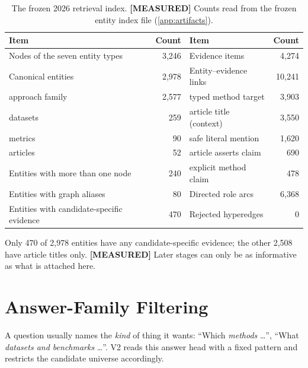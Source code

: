 \documentclass[11pt,a4paper]{article}
\newcommand{\cref}[1]{\autoref{#1}}
\theoremstyle{remark}
\newcommand{\vtag}[2]{{\sffamily\scriptsize\bfseries\textcolor{#1}{[#2]}}}
\newcommand{\Mtag}{\vtag{measgreen}{MEASURED}}
\begin{document}
\begin{table}[!htbp]
\centering
\caption[The frozen 2026 retrieval index]{The frozen 2026 retrieval index. \Mtag{} Counts
read from the frozen entity index file (\cref{app:artifacts}).}
\label{tab:index}
\small
\begin{tabular}{lr@{\hspace{1.2cm}}lr}
\toprule
Item & Count & Item & Count\\
\midrule
Nodes of the seven entity types & 3{,}246 & Evidence items & 4{,}274\\
Canonical entities & 2{,}978 & Entity--evidence links & 10{,}241\\
\quad approach family & 2{,}577 & \quad typed method target & 3{,}903\\
\quad datasets & 259 & \quad article title (context) & 3{,}550\\
\quad metrics & 90 & \quad safe literal mention & 1{,}620\\
\quad articles & 52 & \quad article asserts claim & 690\\
Entities with more than one node & 240 & \quad explicit method claim & 478\\
Entities with graph aliases & 80 & Directed role arcs & 6{,}368\\
Entities with candidate-specific evidence & 470 & Rejected hyperedges & 0\\
\bottomrule
\end{tabular}
\end{table}

\begin{cautionbox}
Only 470 of 2{,}978 entities have any candidate-specific evidence; the other 2{,}508
have article titles only. \Mtag{} Later stages can only be as informative as what is
attached here.
\end{cautionbox}

\section{Answer-Family Filtering}
\label{sec:family}

A question usually names the \emph{kind} of thing it wants: ``Which \emph{methods}
\dots'', ``What \emph{datasets and benchmarks} \dots''. V2 reads this answer head with a
fixed pattern and restricts the candidate universe accordingly.
\end{document}

